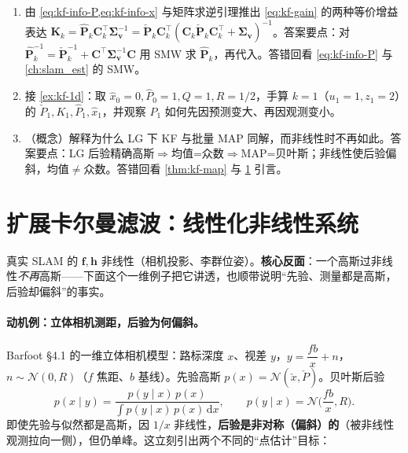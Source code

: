 \begin{practice}
\begin{enumerate}
  \item 由 \cref{eq:kf-info-P,eq:kf-info-x} 与矩阵求逆引理推出 \cref{eq:kf-gain} 的两种等价增益表达 $\mathbf{K}_k=\hat{\mathbf{P}}_k\mathbf{C}_k^\top\boldsymbol{\Sigma}_{\mathbf{v}}^{-1}=\check{\mathbf{P}}_k\mathbf{C}_k^\top(\mathbf{C}_k\check{\mathbf{P}}_k\mathbf{C}_k^\top+\boldsymbol{\Sigma}_{\mathbf{v}})^{-1}$。答案要点：对 $\hat{\mathbf{P}}_k^{-1}=\check{\mathbf{P}}_k^{-1}+\mathbf{C}^\top\boldsymbol{\Sigma}_{\mathbf{v}}^{-1}\mathbf{C}$ 用 SMW 求 $\hat{\mathbf{P}}_k$，再代入。答错回看 \cref{eq:kf-info-P} 与 \cref{ch:slam_est} 的 SMW。
  \item 接 \cref{ex:kf-1d}：取 $\hat{x}_0=0,\hat{P}_0=1,Q=1,R=1/2$，手算 $k=1$（$u_1=1,z_1=2$）的 $\check{P}_1,K_1,\hat{P}_1,\hat{x}_1$，并观察 $\hat{P}_1$ 如何先因预测变大、再因观测变小。
  \item （概念）解释为什么 LG 下 KF 与批量 MAP 同解，而非线性时不再如此。答案要点：LG 后验精确高斯$\Rightarrow$均值=众数$\Rightarrow$MAP=贝叶斯；非线性使后验偏斜，均值$\ne$众数。答错回看 \cref{thm:kf-map} 与 \cref{sec:ekf} 引言。
\end{enumerate}
\end{practice}

\section{扩展卡尔曼滤波：线性化非线性系统}
\label{sec:ekf}

真实 SLAM 的 $\mathbf{f},\mathbf{h}$ 非线性（相机投影、李群位姿）。\textbf{核心反面}：一个高斯过非线性\emph{不再}高斯——下面这个一维例子把它讲透，也顺带说明“先验、测量都是高斯，后验却偏斜”的事实。

\paragraph{动机例：立体相机测距，后验为何偏斜。}
Barfoot\cite{barfoot2024state} §4.1 的一维立体相机模型：路标深度 $x$、视差 $y$，$y=\dfrac{fb}{x}+n$，$n\sim\mathcal{N}(0,R)$（$f$ 焦距、$b$ 基线）。先验高斯 $p(x)=\mathcal{N}(\check{x},\check{P})$。贝叶斯后验
\begin{equation}
  p(x\mid y)=\frac{p(y\mid x)\,p(x)}{\int p(y\mid x)\,p(x)\,\mathrm{d}x},\qquad
  p(y\mid x)=\mathcal{N}\!\Big(\frac{fb}{x},R\Big).
  \label{eq:stereo-bayes}
\end{equation}
即使先验与似然都是高斯，因 $1/x$ 非线性，\textbf{后验是非对称（偏斜）的}（被非线性观测拉向一侧），但仍单峰。这立刻引出两个不同的“点估计”目标：

